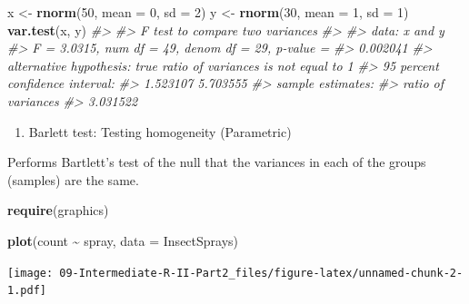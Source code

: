 \documentclass[
]{book}
\newenvironment{Shaded}{\begin{snugshade}}{\end{snugshade}}
\newcommand{\AttributeTok}[1]{\textcolor[rgb]{0.13,0.29,0.53}{#1}}
\newcommand{\CommentTok}[1]{\textcolor[rgb]{0.56,0.35,0.01}{\textit{#1}}}
\newcommand{\DecValTok}[1]{\textcolor[rgb]{0.00,0.00,0.81}{#1}}
\newcommand{\FunctionTok}[1]{\textcolor[rgb]{0.13,0.29,0.53}{\textbf{#1}}}
\newcommand{\NormalTok}[1]{#1}
\newcommand{\OtherTok}[1]{\textcolor[rgb]{0.56,0.35,0.01}{#1}}
\newcommand{\SpecialCharTok}[1]{\textcolor[rgb]{0.81,0.36,0.00}{\textbf{#1}}}
\providecommand{\tightlist}{%
  \setlength{\itemsep}{0pt}\setlength{\parskip}{0pt}}
\begin{document}
\begin{Shaded}
\begin{Highlighting}[]
\NormalTok{x }\OtherTok{\textless{}{-}} \FunctionTok{rnorm}\NormalTok{(}\DecValTok{50}\NormalTok{, }\AttributeTok{mean =} \DecValTok{0}\NormalTok{, }\AttributeTok{sd =} \DecValTok{2}\NormalTok{)}
\NormalTok{y }\OtherTok{\textless{}{-}} \FunctionTok{rnorm}\NormalTok{(}\DecValTok{30}\NormalTok{, }\AttributeTok{mean =} \DecValTok{1}\NormalTok{, }\AttributeTok{sd =} \DecValTok{1}\NormalTok{)}
\FunctionTok{var.test}\NormalTok{(x, y)}
\CommentTok{\#\textgreater{} }
\CommentTok{\#\textgreater{}  F test to compare two variances}
\CommentTok{\#\textgreater{} }
\CommentTok{\#\textgreater{} data:  x and y}
\CommentTok{\#\textgreater{} F = 3.0315, num df = 49, denom df = 29, p{-}value =}
\CommentTok{\#\textgreater{} 0.002041}
\CommentTok{\#\textgreater{} alternative hypothesis: true ratio of variances is not equal to 1}
\CommentTok{\#\textgreater{} 95 percent confidence interval:}
\CommentTok{\#\textgreater{}  1.523107 5.703555}
\CommentTok{\#\textgreater{} sample estimates:}
\CommentTok{\#\textgreater{} ratio of variances }
\CommentTok{\#\textgreater{}           3.031522}
\end{Highlighting}
\end{Shaded}

\begin{enumerate}
\def\labelenumi{\alph{enumi}.}
\setcounter{enumi}{1}
\tightlist
\item
  Barlett test: Testing homogeneity (Parametric)
\end{enumerate}

Performs Bartlett's test of the null that the variances in each of the groups (samples) are the same.

\begin{Shaded}
\begin{Highlighting}[]
\FunctionTok{require}\NormalTok{(graphics)}

\FunctionTok{plot}\NormalTok{(count }\SpecialCharTok{\textasciitilde{}}\NormalTok{ spray, }\AttributeTok{data =}\NormalTok{ InsectSprays)}
\end{Highlighting}
\end{Shaded}

\texttt{[image: 09-Intermediate-R-II-Part2\_files/figure-latex/unnamed-chunk-2-1.pdf]}

\begin{Shaded}
\end{Shaded}
\end{document}
